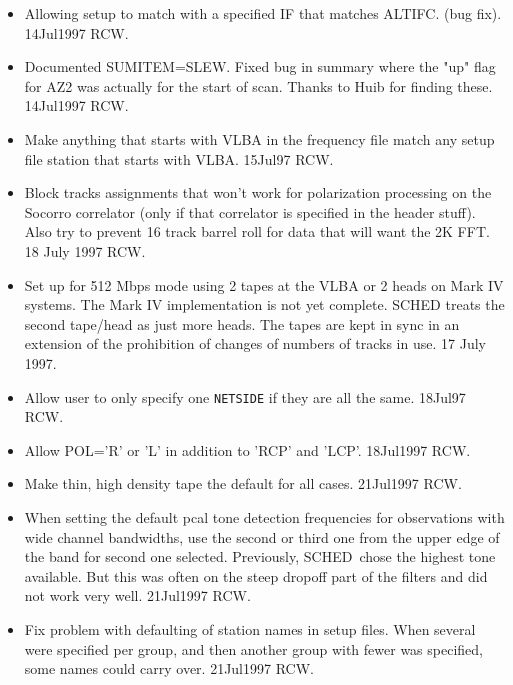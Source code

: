 \documentclass{report}
\newcommand{\schedb}{{\sc SCHED~}}
\begin{document}
\begin{itemize}
\item Allowing setup to match with a specified IF that matches ALTIFC.
      (bug fix).  14Jul1997 RCW.

\item Documented SUMITEM=SLEW.  Fixed bug in summary where the "up"
      flag for AZ2 was actually for the start of scan.  Thanks to
      Huib for finding these.  14Jul1997  RCW.

\item Make anything that starts with VLBA in the frequency file
      match any setup file station that starts with VLBA.
      15Jul97 RCW.

\item Block tracks assignments that won't work for polarization
      processing on the Socorro correlator (only if that correlator
      is specified in the header stuff).  Also try to prevent
      16 track barrel roll for data that will want the 2K FFT.
      18 July 1997 RCW.

\item Set up for 512 Mbps mode using 2 tapes at the VLBA or 2 heads
      on Mark IV systems.  The Mark IV implementation is not yet
      complete.  SCHED treats the second tape/head as just more
      heads.  The tapes are kept in sync in an extension of the
      prohibition of changes of numbers of tracks in use.
      17 July 1997.

\item Allow user to only specify one {\tt NETSIDE} if they are all
      the same.  18Jul97 RCW.

\item Allow POL='R' or 'L' in addition to 'RCP' and 'LCP'.
      18Jul1997 RCW.

\item Make thin, high density tape the default for all cases.
      21Jul1997 RCW.

\item When setting the default pcal tone detection frequencies for
      observations with wide channel bandwidths, use the second or
      third one from the upper edge of the band for second one
      selected.  Previously, \schedb chose the highest tone
      available.  But this was often on the steep dropoff part
      of the filters and did not work very well.  21Jul1997 RCW.

\item Fix problem with defaulting of station names in setup files.
      When several were specified per group, and then another
      group with fewer was specified, some names could carry over.
      21Jul1997 RCW.


\end{itemize}
\end{document}
